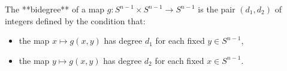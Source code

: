 The **bidegree** of a map $g: S^{n-1} \times S^{n-1} \rightarrow S^{n-1}$ is the pair $(d_1, d_2)$ of integers defined by the condition that:

\begin{itemize}
\item the map $x \mapsto g(x, y)$ has degree $d_1$ for each fixed $y \in S^{n-1}$,
\item the map $y \mapsto g(x, y)$ has degree $d_2$ for each fixed $x \in S^{n-1}$.
\end{itemize}
